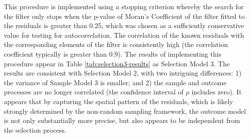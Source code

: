 \documentclass[preprint, 3p,
authoryear]{elsarticle} %
\begin{document}
This procedure is implemented using a stopping criterion whereby the
search for the filter only stops when the p-value of Moran's Coefficient
of the filter fitted to the residuals is greater than 0.25, which was
chosen as a sufficiently conservative value for testing for
autocorrelation. The correlation of the known residuals with the
corresponding elements of the filter is consistently high (the
correlation coefficient typically is greater than 0.9). The results of
implementing this procedure appear in Table \ref{tab:selection3-results}
as Selection Model 3. The results are consistent with Selection Model 2,
with two intriguing differences: 1) the variance of Sample Model 3 is
smaller; and 2) the sample and outcome processes are no longer
correlated (the confidence interval of \(\rho\) includes zero). It
appears that by capturing the spatial pattern of the residuals, which is
likely strongly determined by the non-random sampling framework, the
outcome model is not only substantially more precise, but also appears
to be independent from the selection process.
\end{document}
